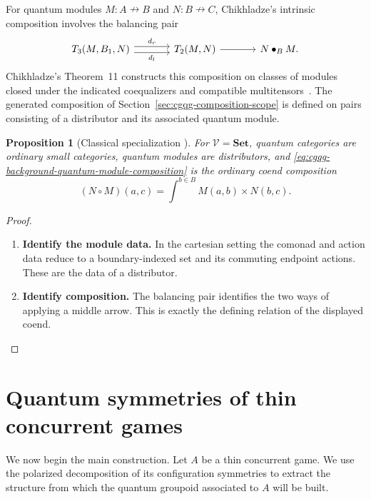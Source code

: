 \documentclass[oneside]{article}
\newcommand{\xnrightarrow}[1]{\mathrel{\overset{#1}{\nrightarrow}}}
\theoremstyle{plain}
\newtheorem{proposition}[theorem]{Proposition}
\theoremstyle{definition}
\theoremstyle{remark}
\begin{document}
For quantum modules \(M:A\xnrightarrow{}B\) and
\(N:B\xnrightarrow{}C\), Chikhladze's intrinsic composition involves
the balancing pair
\begin{equation}
 \begin{tikzcd}[column sep=large]
 T_3(M,B_1,N)
   \arrow[r,shift left=.7ex,"d_r"]
   \arrow[r,shift right=.7ex,"d_l"']
 &T_2(M,N)\arrow[r]&N\bullet_B M .
 \end{tikzcd}
 \label{eq:cgqg-background-quantum-module-composition}
\end{equation}
Chikhladze's Theorem~11 constructs this composition on classes of modules closed under the indicated coequalizers and compatible multitensors~\cite{Chikhladze2010QuantumModules}. The generated composition of Section~\ref{sec:cgqg-composition-scope} is defined on pairs consisting of a distributor and its associated quantum module.

\begin{proposition}[Classical specialization {\cite[\S4]{Chikhladze2010QuantumModules}}]
\label{prop:cgqg-background-quantum-modules-set}
For \(\mathcal V=\mathbf{Set}\), quantum categories are ordinary
small categories, quantum modules are distributors, and
\eqref{eq:cgqg-background-quantum-module-composition} is the ordinary
coend composition
\[
 (N\circ M)(a,c)=\int^{b\in B}M(a,b)\times N(b,c).
\]
\end{proposition}
\begin{proof}
    \leavevmode
    \begin{enumerate}[beginpenalty=10000]
        \item \textbf{Identify the module data.} In the cartesian setting the comonad and action data reduce to a boundary-indexed set and its commuting endpoint actions. These are the data of a distributor.

        \item \textbf{Identify composition.} The balancing pair identifies the two ways of applying a middle arrow. This is exactly the defining relation of the displayed coend. \qedhere
    \end{enumerate}
\end{proof}

\section{Quantum symmetries of thin concurrent games}
\label{sec:cgqg-game-qg}
We now begin the main construction. Let \(A\) be a thin concurrent game. We use the polarized decomposition of its configuration symmetries to extract the structure from which the quantum groupoid associated to \(A\) will be built.
\end{document}
